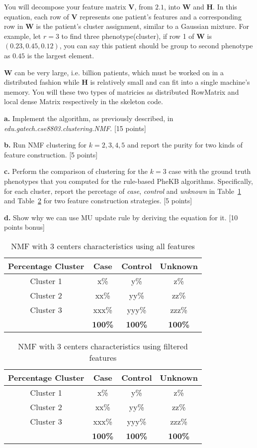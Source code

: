 \documentclass[12pt]{article}
\begin{document}
You will decompose your feature matrix $\bm{V}$, from $\bm{2.1}$, into $\bm{W}$ and $\bm{H}$. In this equation, each row of $\bm{V}$ represents one patient's features and a corresponding row in $\bm{W}$ is the patient's cluster assignment, similar to a Gaussian mixture. For example, let $r = 3$ to find three phenotype(cluster), if row 1 of $\bm{W}$ is $(0.23, 0.45, 0.12)$, you can say this patient should be group to second phenotype as $0.45$ is the largest element.

$\bm{W}$ can be very large, i.e. billion patients, which must be worked on in a distributed fashion while $\bm{H}$ is relatively small and can fit into a single machine's memory. You will these two types of matricies as distributed RowMatrix and local dense Matrix respectively in the skeleton code.

\textbf{a.} Implement the algorithm, as previously described, in \textit{edu.gatech.cse8803.clustering.NMF}. [15 points] 

\textbf{b.} Run NMF clustering for $k=2,3,4,5$ and report the purity for two kinds of feature construction. [5 points]

\textbf{c.} Perform the comparison of clustering for the $k=3$ case with the ground truth phenotypes that you computed for the rule-based PheKB algorithms. Specifically, for each cluster, report the percetage of \textit{case}, \textit{control} and \textit{unknown} in Table~\ref{tbl:nmfall} and Table~\ref{tbl:nmffiltered} for two feature construction strategies. [5 points] 

\textbf{d.} Show why we can use MU update rule by deriving the equation for it. [10 points bonus]

\begin{table}[H]
\centering
\begin{tabular}{ c | c | c | c }
  \hline
  Percentage Cluster & Case & Control & Unknown\\
  \hline                       
  Cluster 1 & x\% & y\% & z\% \\
  Cluster 2 & xx\% & yy\% & zz\% \\
  Cluster 3 & xxx\% & yyy\% & zzz\% \\
  \hline  
   & \bf{100\%} & \bf{100\%} & \bf{100\%} \\
  \hline  
\end{tabular}
\caption{NMF with 3 centers characteristics using all features}
\label{tbl:nmfall}
\end{table}
\begin{table}[H]
\centering
\begin{tabular}{ c | c | c | c }
  \hline
  Percentage Cluster & Case & Control & Unknown\\
  \hline                       
  Cluster 1 & x\% & y\% & z\% \\
  Cluster 2 & xx\% & yy\% & zz\% \\
  Cluster 3 & xxx\% & yyy\% & zzz\% \\
  \hline  
   & \bf{100\%} & \bf{100\%} & \bf{100\%} \\
  \hline  
\end{tabular}
\caption{NMF with 3 centers characteristics using filtered features}
\label{tbl:nmffiltered}
\end{table}
\end{document}
